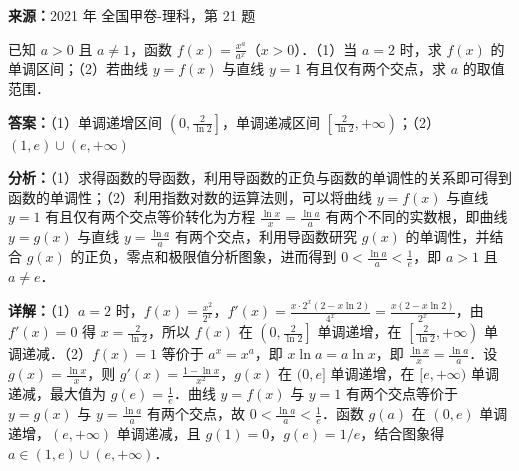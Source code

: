 \begin{question}[points=12]
\textbf{来源：}2021 年 全国甲卷-理科，第 21 题\par
已知 $a>0$ 且 $a\neq 1$，函数 $f(x) = \frac{x^a}{a^x}$（$x>0$）．（1）当 $a=2$ 时，求 $f(x)$ 的单调区间；（2）若曲线 $y=f(x)$ 与直线 $y=1$ 有且仅有两个交点，求 $a$ 的取值范围．
\begin{solution}
\textbf{答案：}（1）单调递增区间 $\left(0, \frac{2}{\ln 2}\right]$，单调递减区间 $\left[\frac{2}{\ln 2}, +\infty\right)$；（2）$(1,e) \cup (e, +\infty)$

\textbf{分析：}（1）求得函数的导函数，利用导函数的正负与函数的单调性的关系即可得到函数的单调性；（2）利用指数对数的运算法则，可以将曲线 $y=f(x)$ 与直线 $y=1$ 有且仅有两个交点等价转化为方程 $\frac{\ln x}{x} = \frac{\ln a}{a}$ 有两个不同的实数根，即曲线 $y=g(x)$ 与直线 $y=\frac{\ln a}{a}$ 有两个交点，利用导函数研究 $g(x)$ 的单调性，并结合 $g(x)$ 的正负，零点和极限值分析图象，进而得到 $0<\frac{\ln a}{a}<\frac{1}{e}$，即 $a>1$ 且 $a\neq e$．

\textbf{详解：}（1）$a=2$ 时，$f(x)=\frac{x^2}{2^x}$，$f'(x)=\frac{x\cdot2^x(2-x\ln2)}{4^x}=\frac{x(2-x\ln2)}{2^x}$，由 $f'(x)=0$ 得 $x=\frac{2}{\ln2}$，所以 $f(x)$ 在 $\left(0,\frac{2}{\ln2}\right]$ 单调递增，在 $\left[\frac{2}{\ln2}, +\infty\right)$ 单调递减．（2）$f(x)=1$ 等价于 $a^x = x^a$，即 $x\ln a = a\ln x$，即 $\frac{\ln x}{x} = \frac{\ln a}{a}$．设 $g(x)=\frac{\ln x}{x}$，则 $g'(x)=\frac{1-\ln x}{x^2}$，$g(x)$ 在 $(0,e]$ 单调递增，在 $[e,+\infty)$ 单调递减，最大值为 $g(e)=\frac{1}{e}$．曲线 $y=f(x)$ 与 $y=1$ 有两个交点等价于 $y=g(x)$ 与 $y=\frac{\ln a}{a}$ 有两个交点，故 $0<\frac{\ln a}{a}<\frac{1}{e}$．函数 $g(a)$ 在 $(0,e)$ 单调递增，$(e,+\infty)$ 单调递减，且 $g(1)=0$，$g(e)=1/e$，结合图象得 $a\in(1,e)\cup(e,+\infty)$．
\end{solution}
\end{question}


